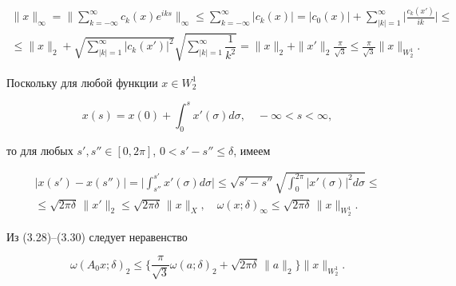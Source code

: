 \begin{multline}


\|x\|_{\infty} =\bigg\|\sum_{k=-\infty}^\infty c_k(x) e^{iks}


\bigg\|_{\infty}


\leq\sum_{k=-\infty}^\infty |c_k(x)|= |c_0(x)|+


\sum_{|k|=1}^\infty\biggl|\frac{c_k(x')}{ik}\biggr| \leq \\


%


\leq \|x\|_2 +\sqrt{\textstyle\sum\limits_{|k|=1}^\infty|c_k(x')|^2}


\sqrt{\textstyle\sum\limits_{|k|=1}^\infty\dfrac{1}{k^2}}=


\|x\|_2 +\|x'\|_2


\frac{\pi}{\sqrt{3}}\leq \frac{\pi}{\sqrt{3}}\|x\|_{W_2^1}.


\end{multline}


Поскольку для любой функции $x\in W_2^1$


$$


x(s)=x(0)+\int_0^sx'(\sigma) d\sigma ,\quad


-\infty <s<\infty ,


$$


то для любых $s',s''\in [0,2\pi]$, $0<s'-s''\leq \delta$, имеем


\begin{multline}


|x(s')-x(s'')|=\bigg|\int_{s''}^{s'}x'(\sigma) d\sigma \bigg| \leq


\sqrt {s'-s''}\sqrt{\int_0^{2\pi}|x'(\sigma)|^2d\sigma}\leq \\


%


\leq \sqrt{2\pi \delta}\,\|x'\|_2 \leq \sqrt{2\pi \delta}\,\|x\|_{{X}},


\quad \omega(x;\delta)_{\infty} \leq \sqrt{2\pi \delta}\,\|x\|_{{W_2^1}}.


\end{multline}


Из (3.28)--(3.30) следует неравенство


\begin{equation}


\omega(A_0x;\delta)_2\leq \bigg\{ \frac{\pi}{\sqrt{3}}\omega(a;\delta)_2


+\sqrt{2\pi\delta}\,\|a\|_2\bigg\}\|x\|_{{W_2^1}}.


\end{equation}





